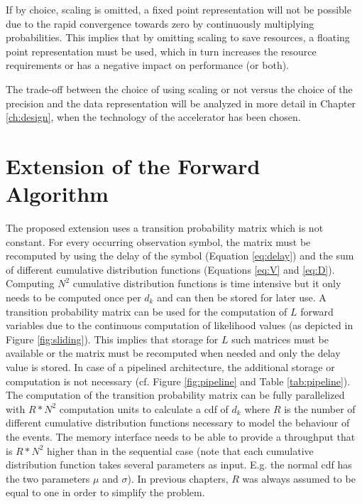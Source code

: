 \documentclass[mscthesis]{usiinfthesis}
\begin{document}
If by choice, scaling is omitted, a fixed point representation will not be
possible due to the rapid convergence towards zero by continuously multiplying
probabilities. This implies that by omitting scaling to save
resources, a floating point representation must be used, which in turn increases
the resource requirements or has a negative impact on performance (or both).

The trade-off between the choice of using scaling or not versus the choice of
the precision and the data representation will be analyzed in more detail in
Chapter \ref{ch:design}, when the technology of the accelerator has been
chosen.

\section{Extension of the Forward Algorithm}
\label{ch:analysis_extension}

The proposed extension uses a transition probability matrix which is not
constant. For every occurring observation symbol, the matrix must be recomputed
by using the delay of the symbol (Equation \ref{eq:delay}) and the sum of
different cumulative distribution functions (Equations \ref{eq:V} and
\ref{eq:D}). Computing $N^2$ cumulative distribution functions is time
intensive but it only needs to be computed once per $d_k$ and can then be
stored for later use. A transition probability matrix can be used for the
computation of $L$ forward variables due to the continuous computation of
likelihood values (as depicted in Figure \ref{fig:sliding}). This implies that
storage for $L$ such matrices must be available or the matrix must be
recomputed when needed and only the delay value is stored. In case of
a pipelined architecture, the additional storage or computation is not
necessary (cf. Figure \ref{fig:pipeline} and Table \ref{tab:pipeline}). The
computation of the transition probability matrix can be fully parallelized with
$R*N^2$ computation units to calculate a \gls{cdf} of $d_k$ where $R$ is the
number of different cumulative distribution functions necessary to model the
behaviour of the events. The memory interface needs to be able to provide
a throughput that is $R*N^2$ higher than in the sequential case (note that each
cumulative distribution function takes several parameters as input. E.g. the
normal \gls{cdf} has the two parameters $\mu$ and $\sigma$). In previous
chapters, $R$ was always assumed to be equal to one in order to simplify the
problem.
\end{document}
